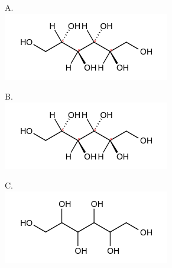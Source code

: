 \documentclass[10pt]{article}
\begin{document}
A.\\
\includegraphics{smile-0efa660eba08f93ffd9514b836bfc9e10e8f2d29}

B.\\
\includegraphics{smile-0dc4b4a8b08e126adc6943e268b83f9bb282cb13}

C.\\
\includegraphics{smile-336260e74628460c0ad254fd104894bea57a1bb9}
\end{document}
